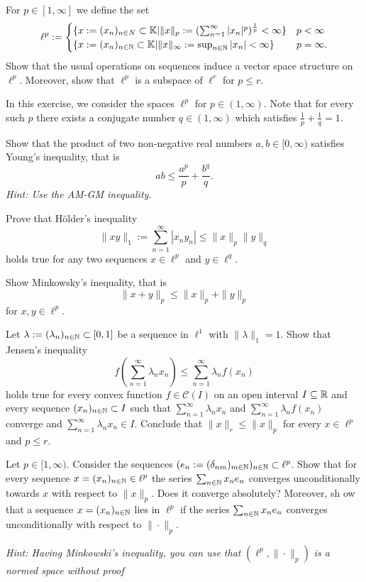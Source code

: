 \begin{Problem}
	For $p\in [1,\infty]$ we define the set
	\[
	\ell^p:=\begin{cases}
		\{x:=(x_n)_{n\in N}\subset \mathbb{K}|\|x\|_p:=(\sum_{n=1}^\infty |x_n|^p)^{\frac{1}{p}}<\infty\} & p<\infty\\
		\{x:=(x_n)_{n\in \mathbb{N}}\subset \mathbb{K}|\|x\|_\infty := \sup_{n\in \mathbb{N}}|x_n|<\infty\} & p=\infty.
	\end{cases}
	\] 
Show that the usual operations on sequences induce a vector space structure on $\ell^p$. Moreover, show that $\ell^p$ is a subspace of $\ell^r$ for $p\le r$.
\end{Problem}

\begin{Problem}
	In this exercise, we consider the spaces $\ell^p$ for $p\in (1,\infty)$. Note that for every such $p$ there exists a conjugate number $q\in (1,\infty)$ which satisfies $\frac{1}{p}+\frac{1}{q}=1$.
	\begin{parts}
	\item Show that the product of two non-negative real numbers $a,b\in [0,\infty)$ satisfies Young's inequality, that is
		\[
		ab\le \frac{a^p}{p}+\frac{b^q}{q}
		.\] 
		\emph{Hint: Use the AM-GM inequality.}
	\item Prove that H\"{o}lder's inequality
		\[
		\|xy\|_1:=\sum_{n=1}^{\infty} |x_ny_n|\le \|x\|_p \|y\|_q
		\]
		holds true for any two sequences $x\in \ell^p$ and $y\in \ell^q$.
	\item Show Minkowsky's inequality, that is
		\[
		\|x+y\|_p\le \|x\|_p + \|y\|_p
		\]
		for $x,y\in \ell^p$.
	\item Let $\lambda:=(\lambda_n)_{n\in \mathbb{N}}\subset [0,1]$ be a sequence in $\ell^1$ with $\|\lambda\|_1=1$. Show that Jensen's inequality
		\[
		f\left( \sum_{n=1}^\infty \lambda_n x_n \right)\le \sum_{n=1}^{\infty} \lambda_n f(x_n)
		\]
		holds true for every convex function $f\in \mathcal{C}(I)$ on an open interval $I\subseteq \mathbb{R}$ and every sequence $(x_n)_{n\in \mathbb{N}}\subset I$ such that $\sum_{n=1}^{\infty} \lambda_n x_n$ and $\sum_{n=1}^{\infty} \lambda_n f(x_n)$ converge and $\sum_{n=1}^{\infty} \lambda_n x_n\in I$. Conclude that $\|x\|_r\le \|x\|_p$ for every $x\in \ell^p$ and $p\le r$.
	\end{parts}
\end{Problem}

\begin{Problem}
	Let $p\in [1,\infty)$. Consider the sequences $(e_n:=(\delta_{nm})_{m\in \mathbb{N}})_{n\in \mathbb{N}}\subset \ell^p$. Show that for every sequence $x=(x_n)_{n\in \mathbb{N}}\in \ell^p$ the series $\sum_{n\in \mathbb{N}} x_n e_n$ converges unconditionally towards $x$ with respect to $\|x\|_p$. Does it converge absolutely? Moreover, sh ow that a sequence $x=(x_n)_{n\in \mathbb{N}}$ lies in $\ell^p$ if the series $\sum_{n\in \mathbb{N}}x_n e_n$ converges unconditionally with respect to $\|\cdot\|_p$.

	\emph{Hint: Having Minkowski's inequality, you can use that } $(\ell^p, \|\cdot\|_p)$ \emph{is a normed space without proof}
\end{Problem}


